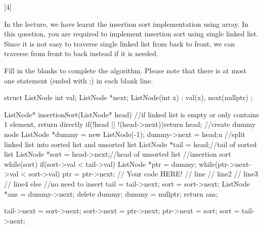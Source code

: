 [4]

In the lecture, we have learnt the insertion sort implementation using array. In this question, you are required to implement insertion sort using single linked list. Since it is not easy to traverse single linked list from back to front, we can traverse from front to back instead if it is needed.

Fill in the blanks to complete the algorithm. Please note that there is at most one statement (ended with ;) in each blank line. 

\begin{cpp}
struct ListNode 
{
    int val;
    ListNode *next;
    ListNode(int x) : val(x), next(nullptr) {}
};
    
ListNode* insertionSort(ListNode* head) {
    //if linked list is empty or only contains 1 element, return directly
    if(!head || !(head->next)){return head;}
    //create dummy node
    ListNode *dummy = new ListNode(-1);
    dummy->next = head;u
    //split linked list into sorted list and unsorted list
    ListNode *tail = head;//tail of sorted list
    ListNode *sort = head->next;//head of unsorted list
    //insertion sort
    while(sort)
    {
       if(sort->val < tail->val)
       {
           ListNode *ptr = dummy;
           while(ptr->next->val < sort->val) ptr = ptr->next;
           // Your code HERE!
           // line
           // line2
           // line3
           // line4
       }
       else
       {	//no need to insert
           tail = tail->next;
           sort = sort->next;
       }
    }
    ListNode *ans = dummy->next;
    delete dummy; dummy = nullptr;
    return ans;
}
\end{cpp}

\begin{solution}[3in]
    \begin{cpp}
        tail->next = sort->next;
        sort->next = ptr->next;
        ptr->next = sort;
        sort = tail->next;
    \end{cpp}
\end{solution}